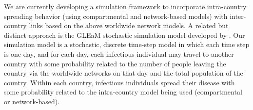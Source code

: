 \documentclass[10pt, journal,onecolumn]{IEEEtran}
\begin{document}
We are currently developing a simulation framework to incorporate intra-country spreading behavior
(using compartmental and network-based models) with inter-country links based on the above
worldwide network models. A related but distinct approach is the GLEaM stochastic simulation model
developed by \cite{balcan2010modeling}. Our simulation model is a stochastic, discrete time-step
model in which each time step is one day, and for each day, each infectious individual may travel
to another country with some probability related to the number of people leaving the country
via the worldwide networks on that day and the total population of the country. Within each country,
infectious individuals spread their disease with some probability related to the intra-country model
being used (compartmental or network-based).







\end{document}
